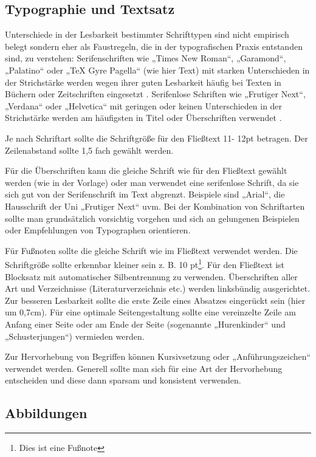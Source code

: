 \subsection{Typographie und Textsatz}\label{subsubsec:typographie}

Unterschiede in der Lesbarkeit bestimmter Schrifttypen sind nicht empirisch belegt sondern eher als Faustregeln, die in der typografischen Praxis entstanden sind, zu verstehen:  Serifenschriften wie „Times New Roman“, „Garamond“, „Palatino“ oder „TeX Gyre Pagella“ (wie hier Text)  mit starken Unterschieden in der Strichstärke werden wegen ihrer guten Lesbarkeit häufig bei Texten in Büchern oder Zeitschriften eingesetzt \cite[S.18]{gotz2004typo}. Serifenlose Schriften wie „Frutiger Next“, „Verdana“ oder „Helvetica“ mit geringen oder keinen Unterschieden in der Strichstärke werden am häufigsten in Titel oder Überschriften verwendet \cite[S.18]{gotz2004typo}. 

  Je nach Schriftart sollte die Schriftgröße für den Fließtext 11- 12pt betragen. Der Zeilenabstand sollte 1,5 fach gewählt werden.

Für die Überschriften kann die gleiche Schrift wie für den Fließtext gewählt werden (wie in der Vorlage) oder man verwendet eine serifenlose Schrift, da sie sich gut von der Serifenschrift im Text abgrenzt. Beispiele sind „Arial“, die Hausschrift der Uni „Frutiger Next“ uvm. Bei der Kombination von Schriftarten sollte man grundsätzlich vorsichtig vorgehen und sich an gelungenen Beispielen oder Empfehlungen von Typographen orientieren. 

Für Fußnoten sollte die gleiche Schrift wie im Fließtext verwendet werden. Die Schriftgröße sollte erkennbar kleiner sein z. B. 10 pt\footnote{Dies ist eine Fußnote}. Für den Fließtext ist Blocksatz mit automatischer Silbentrennung zu verwenden. Überschriften aller Art und Verzeichnisse (Literaturverzeichnis etc.) werden linksbündig ausgerichtet. Zur besseren Lesbarkeit sollte die erste Zeile eines Absatzes eingerückt sein (hier um 0,7cm). Für eine optimale Seitengestaltung sollte eine vereinzelte Zeile am Anfang einer Seite oder am Ende der Seite (sogenannte „Hurenkinder“ und „Schusterjungen“) vermieden werden.

Zur Hervorhebung von Begriffen können Kursivsetzung oder „Anführungszeichen“ verwendet werden. Generell sollte man sich für eine Art der Hervorhebung entscheiden und diese dann sparsam und  konsistent verwenden. 

\subsection{Abbildungen}\label{subsubsec:abbildungen}

